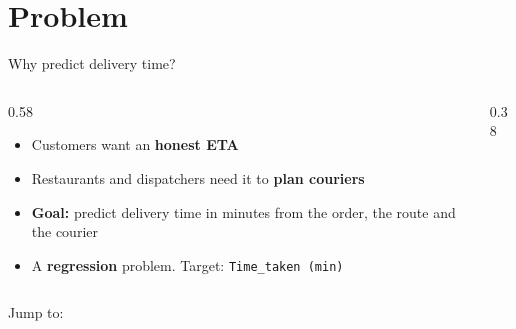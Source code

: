 \documentclass[aspectratio=169,12pt]{beamer}
\begin{document}
\section{Problem}
\begin{frame}[label=s-problem]{Why predict delivery time?}
  \begin{columns}[T]
    \begin{column}{0.58\textwidth}
      \begin{itemize}
        \setlength\itemsep{0.55em}
        \item Customers want an \textbf{honest ETA}
        \item Restaurants and dispatchers need it to \textbf{plan couriers}
        \item \textbf{Goal:} predict delivery time in minutes from the order, the route and the courier
        \item A \textbf{regression} problem. Target: \texttt{Time\_taken (min)}
      \end{itemize}
    \end{column}
    \begin{column}{0.38\textwidth}
      
    \end{column}
  \end{columns}
  \vfill
  \footnotesize\color{grey}Jump to:\ 
    \hyperlink{s-data}{}\ 
    \hyperlink{s-model}{}\ 
    \hyperlink{s-results}{}\ 
    \hyperlink{s-demo}{}
\end{frame}
 
\end{document}
